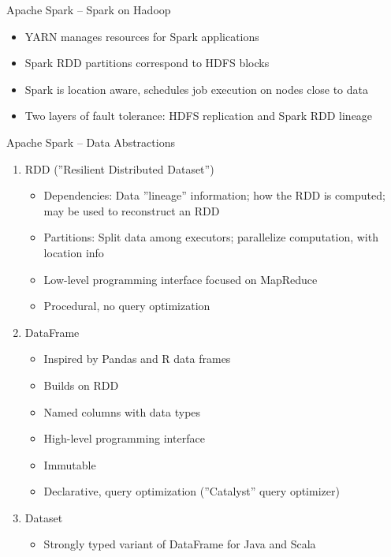 \documentclass[ignorenonframetext,xcolor=x11names]{beamer}
\begin{document}
\begin{frame}{Apache Spark -- Spark on Hadoop}
\begin{itemize}
   \item YARN manages resources for Spark applications
   \item Spark RDD partitions correspond to HDFS blocks
   \item Spark is location aware, schedules job execution on nodes close to data
   \item Two layers of fault tolerance: HDFS replication and Spark RDD lineage
\end{itemize}
\end{frame}

\begin{frame}{Apache Spark -- Data Abstractions}
\small
\begin{enumerate}
  \item RDD (''Resilient Distributed Dataset'')
  \begin{itemize}
    \item Dependencies: Data ''lineage'' information; how the RDD is computed; may be used to reconstruct an RDD
    \item Partitions: Split data among executors; parallelize computation, with location info
    \item Low-level programming interface focused on MapReduce
    \item Procedural, no query optimization
  \end{itemize}
  \item DataFrame
  \begin{itemize}
     \item Inspired by Pandas and R data frames
     \item Builds on RDD
     \item Named columns with data types
     \item High-level programming interface
     \item Immutable
     \item Declarative, query optimization (''Catalyst'' query optimizer)
  \end{itemize}
  \item Dataset
  \begin{itemize}
     \item Strongly typed variant of DataFrame for Java and Scala
  \end{itemize}
\end{enumerate}
\end{frame}
\end{document}
